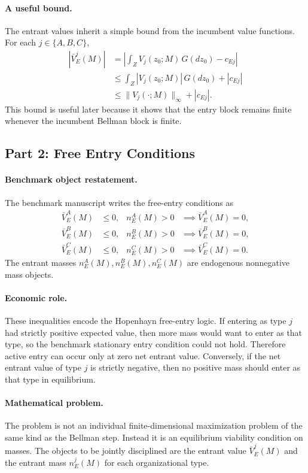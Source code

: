 \paragraph{A useful bound.}
The entrant values inherit a simple bound from the incumbent value functions. For each $j\in\{A,B,C\}$,
\begin{align*}
\left|\bar V_E^j(M)\right|
&=
\left|\int_Z V_j(z_0;M)\,G(dz_0)-c_{Ej}\right|\\
&\le
\int_Z |V_j(z_0;M)|\,G(dz_0)+|c_{Ej}|\\
&\le
\|V_j(\cdot;M)\|_\infty+|c_{Ej}|.
\end{align*}
This bound is useful later because it shows that the entry block remains finite whenever the incumbent Bellman block is finite.

\subsection{Part 2: Free Entry Conditions}

\paragraph{Benchmark object restatement.}
The benchmark manuscript writes the free-entry conditions as
\begin{align*}
\bar V_E^A(M) &\le 0, & n_E^A(M)>0 &\implies \bar V_E^A(M)=0,\\
\bar V_E^B(M) &\le 0, & n_E^B(M)>0 &\implies \bar V_E^B(M)=0,\\
\bar V_E^C(M) &\le 0, & n_E^C(M)>0 &\implies \bar V_E^C(M)=0.
\end{align*}
The entrant masses $n_E^A(M),n_E^B(M),n_E^C(M)$ are endogenous nonnegative mass objects.

\paragraph{Economic role.}
These inequalities encode the Hopenhayn free-entry logic. If entering as type $j$ had strictly positive expected value, then more mass would want to enter as that type, so the benchmark stationary entry condition could not hold. Therefore active entry can occur only at zero net entrant value. Conversely, if the net entrant value of type $j$ is strictly negative, then no positive mass should enter as that type in equilibrium.

\paragraph{Mathematical problem.}
The problem is not an individual finite-dimensional maximization problem of the same kind as the Bellman step. Instead it is an equilibrium viability condition on masses. The objects to be jointly disciplined are the entrant value $\bar V_E^j(M)$ and the entrant mass $n_E^j(M)$ for each organizational type.

